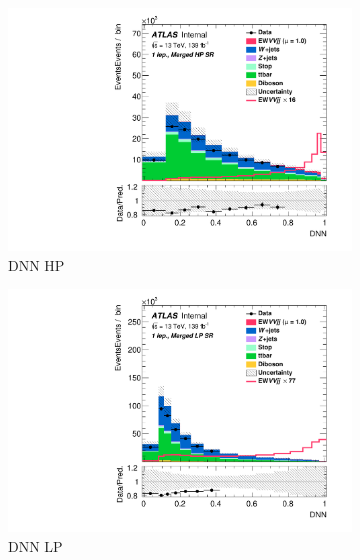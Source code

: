 \begin{figure}[ht]
    \centering
    \begin{subfigure}{0.3\textwidth}
        \includegraphics[width=\linewidth]{figures/1lep/altML/Region_distDNN_DSRVBSHP_BMin0_J0_incJet1_L1_T0_incFat1_Y6051_incTag1_Fat1_Prefit.pdf}
        \caption{DNN HP}
    \end{subfigure}
    \begin{subfigure}{0.3\textwidth}
        \includegraphics[width=\linewidth]{figures/1lep/altML/Region_distDNN_DSRVBSLP_BMin0_J0_incJet1_L1_T0_incFat1_Y6051_incTag1_Fat1_Prefit.pdf}
        \caption{DNN LP}
    \end{subfigure}
    \begin{subfigure}{0.3\textwidth}

\end{subfigure}
\end{figure}
